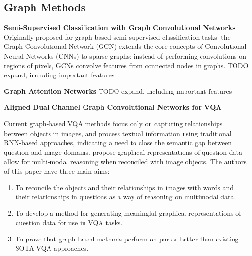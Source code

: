 


\subsection{Graph Methods}


\noindent

\textbf{Semi-Supervised Classification with Graph Convolutional Networks} \cite{kipf2016semi}
\label{kipf2016semi}
Originally proposed for graph-based semi-supervised classification tasks, the Graph Convolutional Network (GCN) extends the core concepts of Convolutional Neural Networks (CNNs) to sparse graphs; instead of performing convolutions on regions of pixels, GCNs convolve features from connected nodes in graphs.
{\color{red} TODO expand, including important features}

\noindent

\textbf{Graph Attention Networks} \cite{velivckovic2017graph}
\label{velivckovic2017graph}
{\color{red} TODO expand, including important features}

\noindent
\textbf{Aligned Dual Channel Graph Convolutional Networks for VQA} \cite{huang2020aligned}
\label{huang2020aligned}

Current graph-based VQA methods focus only on capturing relationships between objects in images, and process textual information using traditional RNN-based approaches, indicating a need to close the semantic gap between question and image domains. \citeauthor{huang2020aligned} propose graphical representations of question data allow for multi-modal reasoning when reconciled with image objects. The authors of this paper have three main aims:

\begin{enumerate}
    \item To reconcile the objects and their relationships in images with words and their relationships in questions as a way of reasoning on multimodal data.
    \item To develop a method for generating meaningful graphical representations of question data for use in VQA tasks.
    \item To prove that graph-based methods perform on-par or better than existing SOTA VQA approaches.
\end{enumerate}

